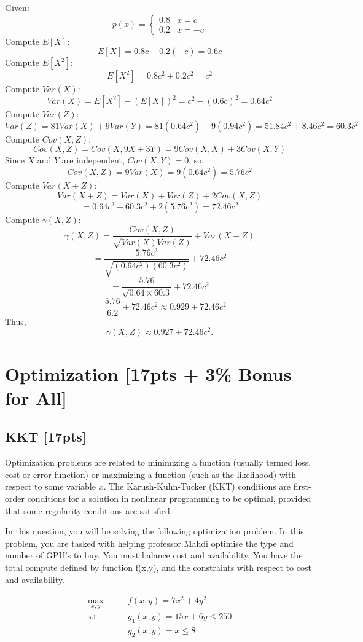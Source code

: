 \documentclass{article}
\begin{document}
Given:
\[ p(x) = \begin{cases} 0.8 & x = c \\ 0.2 & x = -c \end{cases} \]
Compute $E[X]$:
\[ E[X] = 0.8c + 0.2(-c) = 0.6c \]
Compute $E[X^2]$:
\[ E[X^2] = 0.8c^2 + 0.2c^2 = c^2 \]
Compute $Var(X)$:
\[ Var(X) = E[X^2] - (E[X])^2 = c^2 - (0.6c)^2 = 0.64c^2 \]
Compute $Var(Z)$:
\[ Var(Z) = 81Var(X) + 9Var(Y) = 81(0.64c^2) + 9(0.94c^2) = 51.84c^2 + 8.46c^2 = 60.3c^2 \]
Compute $Cov(X,Z)$:
\[ Cov(X,Z) = Cov(X, 9X + 3Y) = 9Cov(X,X) + 3Cov(X,Y) \]
Since $X$ and $Y$ are independent, $Cov(X,Y) = 0$, so:
\[ Cov(X,Z) = 9Var(X) = 9(0.64c^2) = 5.76c^2 \]
Compute $Var(X+Z)$:
\[ Var(X+Z) = Var(X) + Var(Z) + 2Cov(X,Z) \]
\[ = 0.64c^2 + 60.3c^2 + 2(5.76c^2) = 72.46c^2 \]
Compute $\gamma(X,Z)$:
\[ \gamma(X,Z) = \frac{Cov(X,Z)}{\sqrt{Var(X) Var(Z)}} + Var(X+Z) \]
\[ = \frac{5.76c^2}{\sqrt{(0.64c^2)(60.3c^2)}} + 72.46c^2 \]
\[ = \frac{5.76}{\sqrt{0.64 \times 60.3}} + 72.46c^2 \]
\[ = \frac{5.76}{6.2} + 72.46c^2 \approx 0.929 + 72.46c^2 \]
Thus, \[ \gamma(X,Z) \approx 0.927 + 72.46c^2. \]

\bigbreak



\newpage
\section{Optimization [17pts + 3\% Bonus for All]}

\subsection{KKT [17pts]}
Optimization problems are related to minimizing a function (usually termed loss, cost or error function) or maximizing a function (such as the likelihood) with respect to some variable $x$. The Karush-Kuhn-Tucker (KKT) conditions are first-order conditions for a solution in nonlinear programming to be optimal, provided that some regularity conditions are satisfied. 

In this question, you will be solving the following optimization problem. In this problem, you are tasked with helping professor Mahdi optimise the type and number of GPU's to buy. You must balance cost and availability. You have the total compute defined by function f(x,y), and the constraints with respect to cost and availability.

\begin{align*}
    \max_{x,y} \qquad & f(x,y) = 7x^{2} + 4y^{2} \\
    \text{s.t.} \qquad & g_{1}(x,y) = 15x+6y\leq 250 \\
    & g_{2}(x,y) =  x \leq 8
\end{align*}
\end{document}
